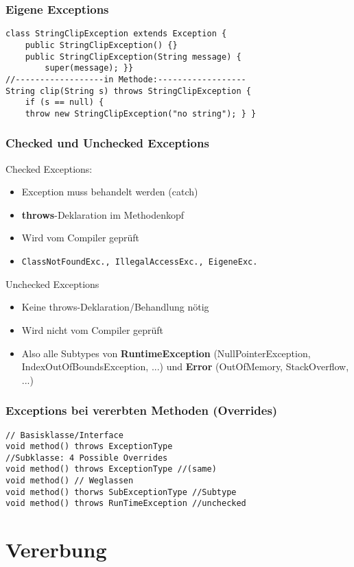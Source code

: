 \begin{multicols*}{5}
		\subsubsection{Eigene Exceptions}
		\begin{lstlisting}
class StringClipException extends Exception {
	public StringClipException() {}
	public StringClipException(String message) {
		super(message); }}
//------------------in Methode:------------------
String clip(String s) throws StringClipException {
	if (s == null) {
	throw new StringClipException("no string"); } }
		\end{lstlisting}
		\subsubsection{Checked und Unchecked Exceptions}
		\textcolor{b}{Checked Exceptions:}
		\begin{itemize}
			\item Exception muss behandelt werden (catch)
			\item \textbf{throws}-Deklaration im Methodenkopf
			\item Wird vom Compiler geprüft
			\item \tiny \texttt{ClassNotFoundExc., IllegalAccessExc., EigeneExc.}
		\end{itemize}
		\textcolor{b}{Unchecked Exceptions}
		\begin{itemize}
			\item Keine throws-Deklaration/Behandlung nötig
			\item Wird nicht vom Compiler geprüft
			\item Also alle Subtypes von \textbf{RuntimeException} (NullPointerException, IndexOutOfBoundsException, ...) und  \textbf{Error} (OutOfMemory, StackOverflow, ...)
		\end{itemize}
		\subsubsection{Exceptions bei vererbten Methoden (Overrides)}
		\begin{lstlisting}
// Basisklasse/Interface
void method() throws ExceptionType
//Subklasse: 4 Possible Overrides
void method() throws ExceptionType //(same)
void method() // Weglassen
void method() thorws SubExceptionType //Subtype
void method() throws RunTimeException //unchecked
		\end{lstlisting}
	
\section{Vererbung}

\end{multicols*}
